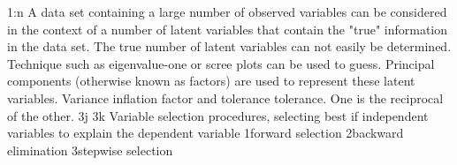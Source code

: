 1:n 
A data set containing a large number of observed variables can be considered in the context of a number of latent variables that contain the "true" information in the data set.
The true number of latent variables can not easily be determined. Technique such as eigenvalue-one or scree plots can be used to guess. 
Principal components (otherwise known as factors) are used to represent these latent variables. 
 Variance inflation factor and tolerance tolerance. One is the reciprocal of the other. 
3j 3k
Variable selection procedures, selecting best if independent variables to explain the dependent variable
1forward selection
2backward elimination
3stepwise selection
